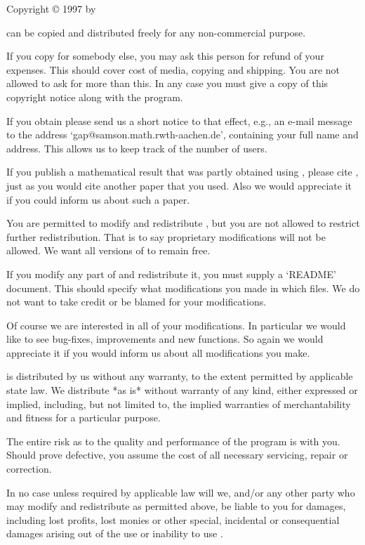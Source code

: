 
\centerline{\undoquotes Copyright {\copyright} 1997 by
}
\bigskip

\begingroup
\parindent 0pt
\parskip 1pc

{\GAP}   can be copied   and  distributed freely  for any  non-commercial
purpose.

If you copy {\GAP} for somebody else, you may ask this person for  refund
of your expenses.  This should cover cost of media, copying and shipping.
You are not allowed to ask for more than this.  In any case you must give
a copy of this copyright notice along with the program.

If you obtain {\GAP} please send us  a short notice to that effect, e.g.,
an  e-mail  message   to  the  address  `gap@samson.math.rwth-aachen.de',
containing your full  name and address.  This  allows us to keep track of
the number of {\GAP} users.

If you  publish  a mathematical result  that  was  partly obtained  using
{\GAP}, please cite {\GAP}, just as you would cite another paper that you
used.   Also we  would appreciate it if you could inform us about  such a
paper.

You  are permitted  to modify and  redistribute  {\GAP},  but you are not
allowed  to restrict further redistribution.  That is to say  proprietary
modifications will  not  be allowed.  We want all  versions  of {\GAP} to
remain free.

If you  modify any part of {\GAP} and redistribute it,  you must supply a
`README'  document.   This should specify what modifications you made  in
which  files.  We do  not  want  to take  credit  or  be blamed  for your
modifications.

Of course we are interested in all of your modifications.  In  particular
we would like to see bug-fixes, improvements and new functions.  So again
we would appreciate it if you would inform us about all modifications you
make.

{\GAP} is distributed by us without any warranty, to the extent permitted
by applicable state law.  We  distribute {\GAP} *as is* without  warranty
of any kind, either expressed or implied, including,  but not limited to,
the implied  warranties  of merchantability and  fitness for a particular
purpose.

The entire risk as to the quality and performance of the program is  with
you.  Should {\GAP} prove defective, you assume the cost of all necessary
servicing, repair or correction.

In no  case  unless  required by applicable law will we, and/or any other
party who  may  modify  and  redistribute  {\GAP}  as permitted above, be
liable  to you for damages, including lost profits, lost monies or  other
special, incidental or consequential damages  arising out  of the  use or
inability to use {\GAP}.

\endgroup
